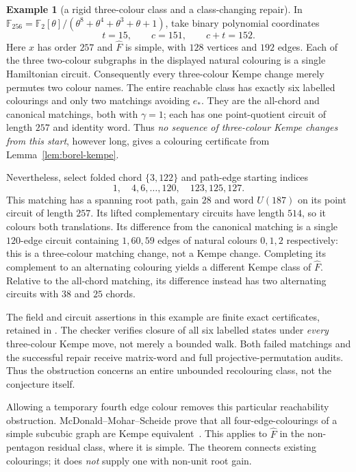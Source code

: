 \documentclass[11pt,a4paper]{article}
\theoremstyle{definition}
\newtheorem{example}[theorem]{Example}
\theoremstyle{remark}
\begin{document}
\begin{example}[a rigid three-colour class and a class-changing repair]\label{ex:borel-kempe-rigid}
In $\mathbb F_{256}=\mathbb F_2[\theta]/(\theta^8+\theta^4+\theta^3+\theta+1)$, take binary polynomial coordinates
\[
                    t=15,\qquad c=151,\qquad c+t=152.
\]
Here $x$ has order $257$ and $\widehat F$ is simple, with $128$ vertices and $192$ edges.  Each of the three two-colour subgraphs in the displayed natural colouring is a single Hamiltonian circuit.  Consequently every three-colour Kempe change merely permutes two colour names.  The entire reachable class has exactly six labelled colourings and only two matchings avoiding $e_*$.  They are the all-chord and canonical matchings, both with $\gamma=1$; each has one point-quotient circuit of length $257$ and identity word.  Thus \emph{no sequence of three-colour Kempe changes from this start}, however long, gives a colouring certificate from Lemma~\ref{lem:borel-kempe}.

Nevertheless, select folded chord $\{3,122\}$ and path-edge starting indices
\[
                  1,\quad 4,6,\ldots,120,\quad 123,125,127.
\]
This matching has a spanning root path, gain $28$ and word $U(187)$ on its point circuit of length $257$.  Its lifted complementary circuits have length $514$, so it colours both translations.  Its difference from the canonical matching is a single $120$-edge circuit containing $1,60,59$ edges of natural colours $0,1,2$ respectively: this is a three-colour matching change, not a Kempe change.  Completing its complement to an alternating colouring yields a different Kempe class of $\widehat F$.  Relative to the all-chord matching, its difference instead has two alternating circuits with $38$ and $25$ chords.
\end{example}

The field and circuit assertions in this example are finite exact certificates, retained in .  The checker verifies closure of all six labelled states under \emph{every} three-colour Kempe move, not merely a bounded walk.  Both failed matchings and the successful repair receive matrix-word and full projective-permutation audits.  Thus the obstruction concerns an entire unbounded recolouring class, not the conjecture itself.

Allowing a temporary fourth edge colour removes this particular reachability obstruction.  McDonald--Mohar--Scheide prove that all four-edge-colourings of a simple subcubic graph are Kempe equivalent~\cite[Theorem~3]{McDonaldMoharScheide12}.  This applies to $\widehat F$ in the non-pentagon residual class, where it is simple.  The theorem connects existing colourings; it does \emph{not} supply one with non-unit root gain.
\end{document}
